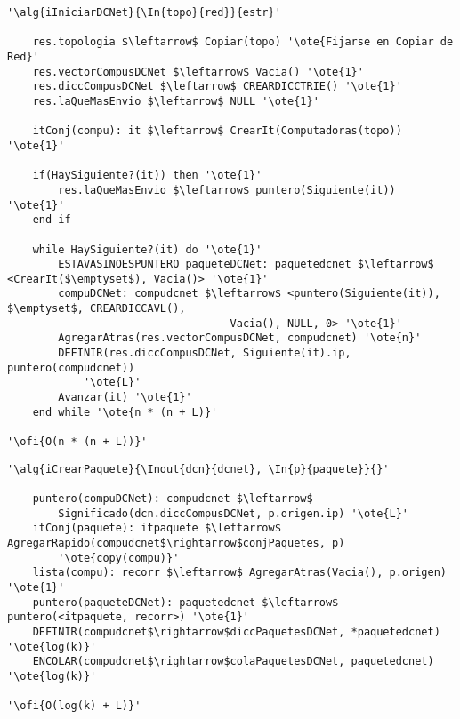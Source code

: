 \begin{lstlisting}[mathescape]
'\alg{iIniciarDCNet}{\In{topo}{red}}{estr}'
	
    res.topologia $\leftarrow$ Copiar(topo) '\ote{Fijarse en Copiar de Red}'
    res.vectorCompusDCNet $\leftarrow$ Vacia() '\ote{1}'
    res.diccCompusDCNet $\leftarrow$ CREARDICCTRIE() '\ote{1}'
    res.laQueMasEnvio $\leftarrow$ NULL '\ote{1}'

    itConj(compu): it $\leftarrow$ CrearIt(Computadoras(topo)) '\ote{1}'

    if(HaySiguiente?(it)) then '\ote{1}'
    	res.laQueMasEnvio $\leftarrow$ puntero(Siguiente(it)) '\ote{1}'
    end if

    while HaySiguiente?(it) do '\ote{1}'
    	ESTAVASINOESPUNTERO paqueteDCNet: paquetedcnet $\leftarrow$ <CrearIt($\emptyset$), Vacia()>	'\ote{1}'
    	compuDCNet: compudcnet $\leftarrow$ <puntero(Siguiente(it)), $\emptyset$, CREARDICCAVL(), 
    							   Vacia(), NULL, 0> '\ote{1}'
    	AgregarAtras(res.vectorCompusDCNet, compudcnet) '\ote{n}'
    	DEFINIR(res.diccCompusDCNet, Siguiente(it).ip, puntero(compudcnet)) 
    		'\ote{L}'
    	Avanzar(it) '\ote{1}'
    end while '\ote{n * (n + L)}'

'\ofi{O(n * (n + L))}'
\end{lstlisting}

\begin{lstlisting}[mathescape]
'\alg{iCrearPaquete}{\Inout{dcn}{dcnet}, \In{p}{paquete}}{}'
	
	puntero(compuDCNet): compudcnet $\leftarrow$ 
		Significado(dcn.diccCompusDCNet, p.origen.ip) '\ote{L}'	
	itConj(paquete): itpaquete $\leftarrow$ AgregarRapido(compudcnet$\rightarrow$conjPaquetes, p) 
		'\ote{copy(compu)}'
	lista(compu): recorr $\leftarrow$ AgregarAtras(Vacia(), p.origen) '\ote{1}'
	puntero(paqueteDCNet): paquetedcnet $\leftarrow$ puntero(<itpaquete, recorr>) '\ote{1}'
	DEFINIR(compudcnet$\rightarrow$diccPaquetesDCNet, *paquetedcnet) '\ote{log(k)}'
	ENCOLAR(compudcnet$\rightarrow$colaPaquetesDCNet, paquetedcnet) '\ote{log(k)}'

'\ofi{O(log(k) + L)}'
\end{lstlisting}

